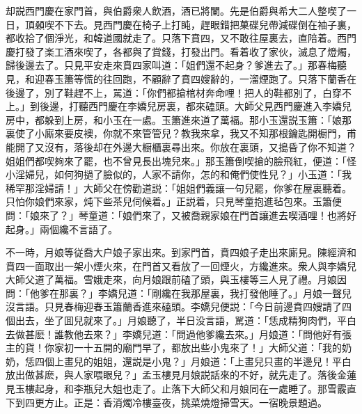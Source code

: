 却説西門慶在家門首，與伯爵衆人飲酒，酒已將闌。先是伯爵與希大二人整喫了一日，頂顙喫不下去。見西門慶在椅子上打盹，趕眼錯把菓碟兒帶減碟倒在袖子裏，都收拾了個淨光，和韓道國就走了。只落下賁四，又不敢往屋裏去，直陪着。西門慶打發了楽工酒來喫了，各都與了賞錢，打發出門。看着收了家伙，滅息了燈燭，歸後邊去了。只見平安走來賁四家叫道：「姐們還不起身？爹進去了。」那春梅聽見，和迎春玉簫等慌的往回跑，不顧辭了賁四嫂辭的，一溜煙跑了。只落下蘭香在後邊了，別了鞋趕不上，駡道：「你們都搶棺材奔命哩！把人的鞋都別了，白穿不上。」到後邊，打聽西門慶在李嬌兒房裏，都來磕頭。大師父見西門慶進入李嬌兒房中，都躲到上房，和小玉在一處。玉簫進來道了萬福。那小玉還説玉簫：「娘那裏使了小廝來要皮襖，你就不來管管兒？教我來拿，我又不知那根鑰匙開橱門，甫能開了又沒有，落後却在外邊大橱櫃裏尋出來。你放在裏頭，又搗昏了你不知道？姐姐們都喫夠來了罷，也不曾見長出塊兒來。」那玉簫倒喫搶的臉飛紅，便道：「怪小淫婦兒，如何狗撾了臉似的，人家不請你，怎的和俺們使性兒？」小玉道：「我稀罕那淫婦請！」大師父在傍勸道説：「姐姐們義讓一句兒罷，你爹在屋裏聽着。只怕你娘們來家，炖下些茶兒伺候着。」正説着，只見琴童抱進毡包來。玉簫便問：「娘來了？」琴童道：「娘們來了，又被喬親家娘在門首讓進去喫酒哩！也將好起身。」兩個纔不言語了。

不一時，月娘等従喬大户娘子家出來。到家門首，賁四娘子走出來廝見。陳經濟和賁四一面取出一架小煙火來，在門首又看放了一回煙火，方纔進來。衆人與李嬌兒大師父道了萬福。雪娥走來，向月娘跟前磕了頭，與玉樓等三人見了禮。月娘因問：「他爹在那裏？」李嬌兒道：「剛纔在我那屋裏，我打發他睡了。」月娘一聲兒沒言語。只見春梅迎春玉簫蘭香進來磕頭。李嬌兒便説：「今日前邊賁四嫂請了四個出去，坐了囬兒就來了。」月娘聽了，半日没言語，駡道：「恁成精狗肉們，平白去做甚麽！誰教他去來？」李嬌兒道：「問過他爹纔去來。」月娘道：「問他好有張主的貨！你家初一十五開的廟門早了，都放出些小鬼來了！」大師父道：「我的奶奶，恁四個上畫兒的姐姐，還説是小鬼？」月娘道：「上畫兒只畫的半邊兒！平白放出做甚麽，與人家喂眼兒？」孟玉樓見月娘説話來的不好，就先走了。落後金蓮見玉樓起身，和李瓶兒大姐也走了。止落下大師父和月娘同在一處睡了。那雪霰直下到四更方止。正是：香消燭冷樓臺夜，挑菜燒燈掃雪天。一宿晚景題過。

